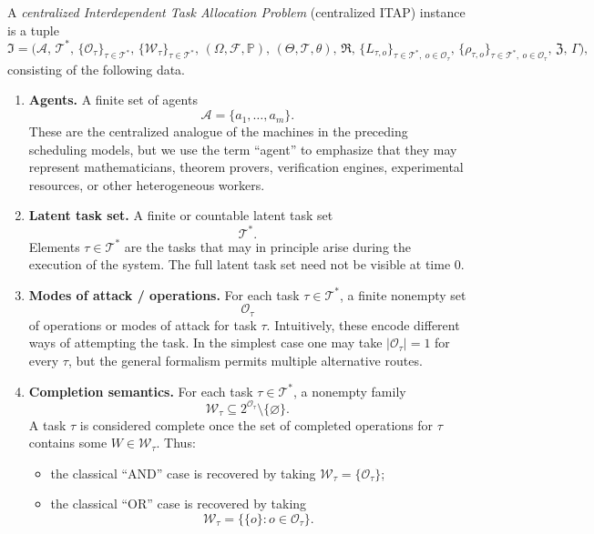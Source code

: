 \begin{definition}
A \emph{centralized Interdependent Task Allocation Problem} (centralized ITAP) instance is a tuple
\[
\mathfrak I=
\bigl(
\mathcal A,\,
\mathcal T^\ast,\,
\{\mathcal O_\tau\}_{\tau\in\mathcal T^\ast},\,
\{\mathcal W_\tau\}_{\tau\in\mathcal T^\ast},\,
(\Omega,\mathcal F,\mathbb P),\,
(\Theta,\mathcal T,\theta),\,
\mathfrak R,\,
\{L_{\tau,o}\}_{\tau\in\mathcal T^\ast,\ o\in\mathcal O_\tau},\,
\{\rho_{\tau,o}\}_{\tau\in\mathcal T^\ast,\ o\in\mathcal O_\tau},\,
\mathfrak Z,\,
\Gamma
\bigr),
\]
consisting of the following data.

\begin{enumerate}
    \item \textbf{Agents.}  
    A finite set of agents
    \[
    \mathcal A=\{a_1,\dots,a_m\}.
    \]
    These are the centralized analogue of the machines in the preceding scheduling models, but we use the term ``agent'' to emphasize that they may represent mathematicians, theorem provers, verification engines, experimental resources, or other heterogeneous workers.

    \item \textbf{Latent task set.}  
    A finite or countable latent task set
    \[
    \mathcal T^\ast.
    \]
    Elements \(\tau\in\mathcal T^\ast\) are the tasks that may in principle arise during the execution of the system. The full latent task set need not be visible at time \(0\).

    \item \textbf{Modes of attack / operations.}  
    For each task \(\tau\in\mathcal T^\ast\), a finite nonempty set
    \[
    \mathcal O_\tau
    \]
    of operations or modes of attack for task \(\tau\). Intuitively, these encode different ways of attempting the task. In the simplest case one may take \(|\mathcal O_\tau|=1\) for every \(\tau\), but the general formalism permits multiple alternative routes.

    \item \textbf{Completion semantics.}  
    For each task \(\tau\in\mathcal T^\ast\), a nonempty family
    \[
    \mathcal W_\tau\subseteq 2^{\mathcal O_\tau}\setminus\{\varnothing\}.
    \]
    A task \(\tau\) is considered complete once the set of completed operations for \(\tau\) contains some \(W\in\mathcal W_\tau\). Thus:
    \begin{itemize}
        \item the classical ``AND'' case is recovered by taking \(\mathcal W_\tau=\{\mathcal O_\tau\}\);
        \item the classical ``OR'' case is recovered by taking
        \[
        \mathcal W_\tau=\bigl\{\{o\}:o\in\mathcal O_\tau\bigr\}.
        \]
    \end{itemize}


\end{enumerate}
\end{definition}
